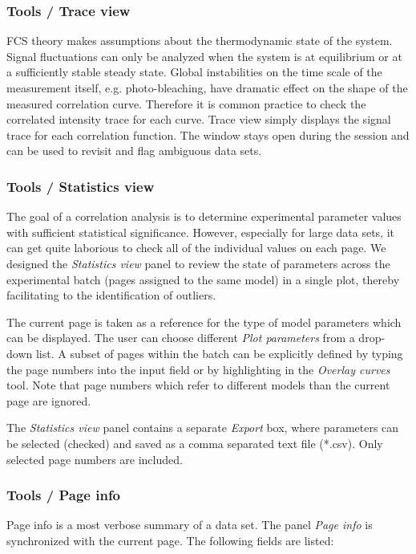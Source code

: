 \subsubsection{Tools / Trace view}
\label{sec:menub.tools.trace}
FCS theory makes assumptions about the thermodynamic state of the system. Signal fluctuations can only be analyzed when the system is at equilibrium or at a sufficiently stable steady state. Global instabilities on the time scale of the measurement itself, e.g. photo-bleaching, have dramatic effect on the shape of the measured correlation curve. Therefore it is common practice to check the correlated intensity trace for each curve. Trace view simply displays the signal trace for each correlation function. The window stays open during the session and can be used to revisit and flag ambiguous data sets.

\subsubsection{Tools / Statistics view}
\label{sec:menub.tools.stati}
The goal of a correlation analysis is to determine experimental parameter values with sufficient statistical significance. However, especially for large data sets, it can get quite laborious to check all of the individual values on each page. We designed the \textit{Statistics view} panel to review the state of parameters across the experimental batch (pages assigned to the same model) in a single plot, thereby facilitating to the identification of outliers.

The current page is taken as a reference for the type of model parameters which can be displayed. The user can choose different \textit{Plot parameters} from a drop-down list. A subset of pages within the batch can be explicitly defined by typing the page numbers into the input field or by highlighting in the \textit{Overlay curves} tool. Note that page numbers which refer to different models than the current page are ignored. 

The \textit{Statistics view} panel contains a separate \textit{Export} box, where parameters can be selected (checked) and saved as a comma separated text file (*.csv). Only selected page numbers are included.

\subsubsection{Tools / Page info}
\label{sec:menub.tools.pagei}
Page info is a most verbose summary of a data set. The panel \textit{Page info} is synchronized with the current page. The following fields are listed:


